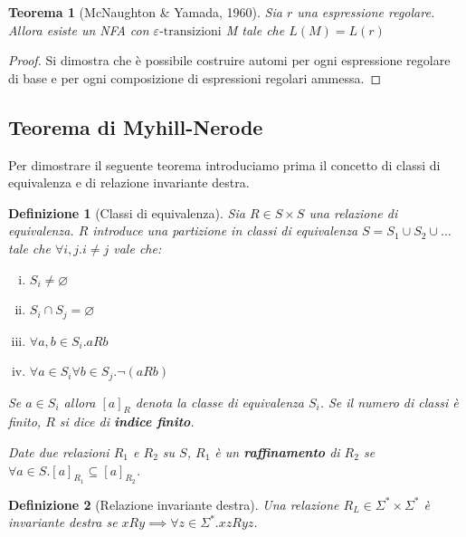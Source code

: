 \documentclass[a4paper,titlepage]{article}
\newtheorem{theorem}{Teorema}[section]
\newtheorem{definition}{Definizione}[section]
\theoremstyle{definition}
\begin{document}
\begin{theorem}[McNaughton \& Yamada, 1960]
	Sia $r$ una espressione regolare. Allora esiste un NFA con $\varepsilon\text{-transizioni}$ M tale che $L(M) = L(r)$ 
\end{theorem}
\begin{proof}
	Si dimostra che è possibile costruire automi per ogni espressione regolare di base e per ogni composizione di espressioni regolari ammessa. 
\end{proof}

\subsection{Teorema di Myhill-Nerode}
Per dimostrare il seguente teorema introduciamo prima il concetto di classi di equivalenza e di relazione invariante destra. 
\begin{definition}[Classi di equivalenza]
	Sia $R\in S\times S$ una relazione di equivalenza. $R$ introduce una partizione in classi di equivalenza $S=S_1\cup S_2\cup\dots$ tale che $\forall i, j. i\neq j$ vale che:
	\begin{enumerate}[(i)]
		\item $S_i\neq\varnothing$
		\item $S_i\cap S_j=\varnothing$
		\item $\forall a,b\in S_i.aRb$
		\item $\forall a\in S_i \forall b\in S_j. \lnot(aRb)$
	\end{enumerate}
	Se $a\in S_i$ allora $[a]_R$ denota la classe di equivalenza $S_i$. Se il numero di classi è finito, $R$ si dice di \textbf{indice finito}. 
	
	Date due relazioni $R_1$ e $R_2$ su $S$, $R_1$ è un \textbf{raffinamento} di $R_2$ se $\forall a\in S.[a]_{R_1}\subseteq[a]_{R_2}$.
\end{definition}

\begin{definition}[Relazione invariante destra]
	Una relazione $R_L \in \Sigma^*\times\Sigma^*$ è invariante destra se $xRy\implies\forall z\in\Sigma^*.xzRyz$.
\end{definition}
\end{document}
